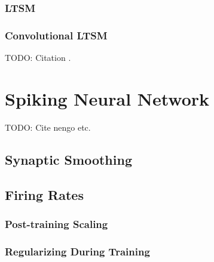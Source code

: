 \subsubsection{LTSM}

\subsubsection{Convolutional LTSM}

\color{red} TODO: Citation \cite{ConvLTSM}. \color{black}

\section{Spiking Neural Network}

\color{red} TODO: Cite nengo etc. \color{black}

\subsection{Synaptic Smoothing}

\subsection{Firing Rates}

\subsubsection{Post-training Scaling}

\subsubsection{Regularizing During Training}
